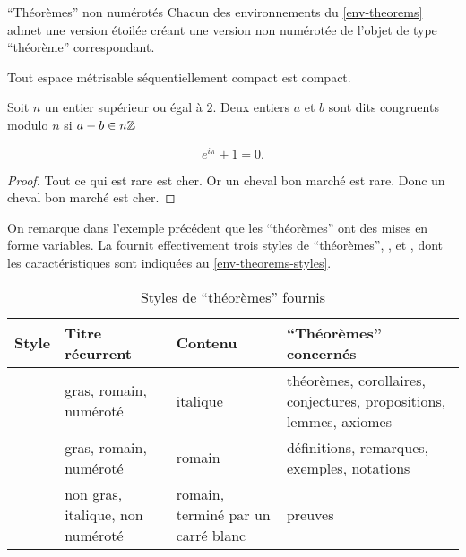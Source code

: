 \begin{dbremark}{\enquote{Théorèmes} non numérotés}{}
  Chacun des environnements du \vref{env-theorems} admet une version étoilée
  créant une version non numérotée de l'objet de type \enquote{théorème}
  correspondant.
\end{dbremark}

\begin{bodycode}
\begin{theorem}
  Tout espace métrisable séquentiellement compact est compact.
\end{theorem}
\begin{definition}
  Soit $n$ un entier supérieur ou égal à $2$. Deux entiers $a$ et $b$
  sont dits congruents modulo $n$ si $a - b \in n\mathbb{Z}$
\end{definition}
\begin{remark*}
  \[
  e^{i\pi}+1=0.
  \]
\end{remark*}
\begin{proof}
  Tout ce qui est rare est cher. Or un cheval bon marché est rare.
  Donc un cheval bon marché est cher.
\end{proof}
\end{bodycode}

On remarque dans l'exemple précédent que les \enquote{théorèmes} ont des mises
en forme variables. La \nwejmauthorcl{} fournit effectivement trois styles de
\enquote{théorèmes}, ,  et
, dont les caractéristiques sont indiquées au
\vref{env-theorems-styles}.

\begin{table}
  \centering
  \begin{tabulary}{\linewidth}{LLLL}
Style                 & Titre récurrent                  & Contenu                            & \enquote{Théorèmes} concernés               \\\toprule
{}    & gras, romain, numéroté           & italique
                      & théorèmes, corollaires, conjectures, propositions, lemmes, axiomes                                                  \\\midrule
{} & gras, romain, numéroté           & romain                             & définitions, remarques, exemples, notations \\\midrule
{}      & non gras, italique, non numéroté & romain, terminé par un carré blanc & preuves                                     \\\bottomrule
  \end{tabulary}
  \caption{Styles de \enquote{théorèmes} fournis}
  \label{env-theorems-styles}
\end{table}

